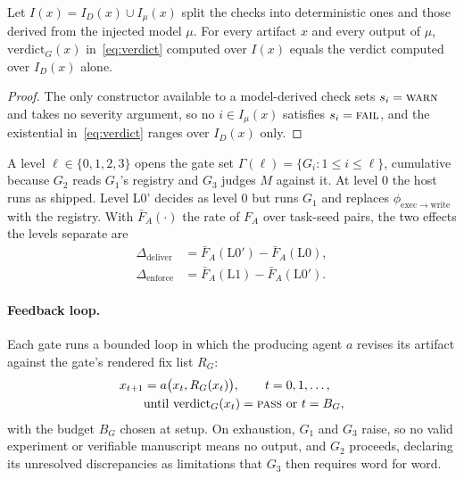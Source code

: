 \documentclass[sigconf,anonymous]{aamas}
\newcommand{\Man}{M}
\newcommand{\Lvl}{\ell}
\newcommand{\pass}{\textsc{pass}}
\newcommand{\fail}{\textsc{fail}}
\newcommand{\warn}{\textsc{warn}}
\begin{document}
\begin{proposition}
\label{prop:model}
Let $I(x) = I_D(x) \cup I_\mu(x)$ split the checks into deterministic ones and those derived from the injected model $\mu$.
For every artifact $x$ and every output of $\mu$, $\mathrm{verdict}_G(x)$ in~\eqref{eq:verdict} computed over $I(x)$ equals the verdict computed over $I_D(x)$ alone.
\end{proposition}

\begin{proof}
The only constructor available to a model-derived check sets $s_i = \warn$ and takes no severity argument, so no $i \in I_\mu(x)$ satisfies $s_i = \fail$, and the existential in~\eqref{eq:verdict} ranges over $I_D(x)$ only.
\end{proof}

\begin{definition}
\label{def:levels}
A level $\Lvl \in \{0, 1, 2, 3\}$ opens the gate set $\Gamma(\Lvl) = \{G_i : 1 \le i \le \Lvl\}$, cumulative because $G_2$ reads $G_1$'s registry and $G_3$ judges $\Man$ against it.
At level 0 the host runs as shipped.
Level L0' decides as level 0 but runs $G_1$ and replaces $\phi_{\mathrm{exec}\to\mathrm{write}}$ with the registry.
With $\bar F_A(\cdot)$ the rate of $F_A$ over task-seed pairs, the two effects the levels separate are
\begin{equation}
\label{eq:effects}
\begin{aligned}
\Delta_{\mathrm{deliver}} &= \bar F_A(\mathrm{L0'}) - \bar F_A(\mathrm{L0}), \\
\Delta_{\mathrm{enforce}} &= \bar F_A(\mathrm{L1}) - \bar F_A(\mathrm{L0'}).
\end{aligned}
\end{equation}
\end{definition}

\paragraph{Feedback loop.}
Each gate runs a bounded loop in which the producing agent $a$ revises its artifact against the gate's rendered fix list $R_G$:
\begin{equation}
\label{eq:loop}
\begin{aligned}
x_{t+1} &= a\big(x_t, R_G(x_t)\big), \qquad t = 0, 1, \dots, \\
&\text{until } \mathrm{verdict}_G(x_t) = \pass \text{ or } t = B_G,
\end{aligned}
\end{equation}
with the budget $B_G$ chosen at setup.
On exhaustion, $G_1$ and $G_3$ raise, so no valid experiment or verifiable manuscript means no output, and $G_2$ proceeds, declaring its unresolved discrepancies as limitations that $G_3$ then requires word for word.
\end{document}

